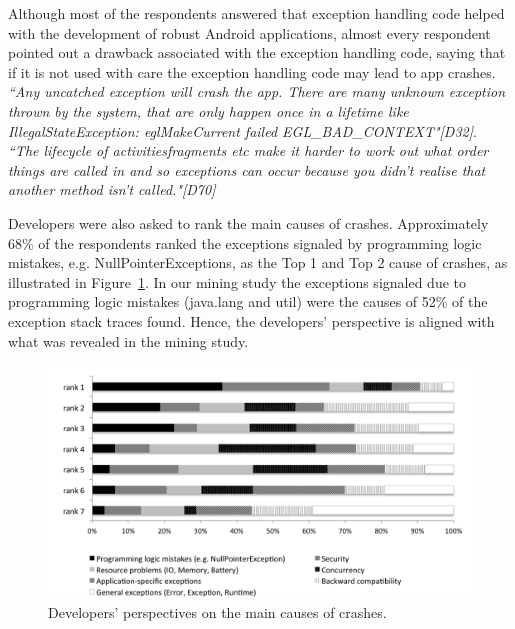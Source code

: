 {Although most of the respondents answered that exception handling code helped with the development of robust Android applications, almost every respondent pointed out a drawback associated with the exception handling code, saying that if it is not used with care the exception handling code may lead to app crashes. \emph{``Any uncatched exception will crash the app. There are many unknown exception thrown by the system, that are only happen once in a lifetime like IllegalStateException: eglMakeCurrent failed EGL\_BAD\_CONTEXT"[D32]}. \emph{``The lifecycle of activities\/fragments etc make it harder to work out what order things are called in and so exceptions can occur because you didn't realise that another method isn't called."[D70]}


Developers were also asked to rank the main causes of crashes. Approximately 68\% of the respondents ranked the exceptions signaled by programming logic mistakes, e.g. NullPointerExceptions, as the Top 1 and Top 2 cause of crashes, as illustrated in Figure~\ref{fig:ranking}. In our mining study the exceptions signaled due to programming logic mistakes (java.lang and util) were the causes of 52\% of the exception stack traces found. Hence, the developers' perspective is aligned with what was revealed in the mining study.
\begin{figure}
\centering \includegraphics[scale=0.60]{ranking.png}
\caption{Developers' perspectives on the main causes of crashes.}\label{fig:ranking}
\end{figure}

}
